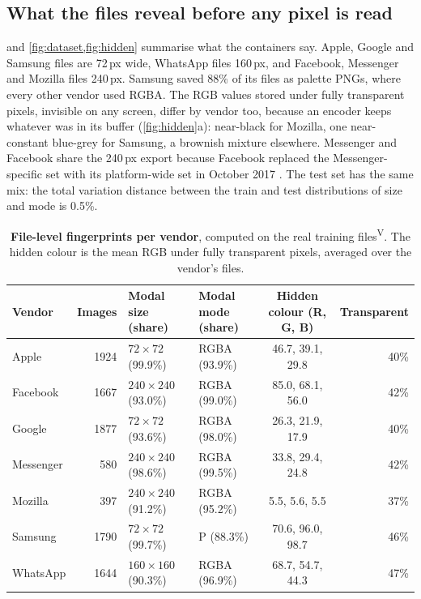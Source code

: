 \documentclass[11pt,a4paper]{article}
\newcommand{\ver}{\textsuperscript{\textcolor{verified}{\sffamily\scriptsize V}}}
\newcommand{\pct}[1]{#1\%}
\begin{document}
\subsection{What the files reveal before any pixel is read}
\label{sec:fingerprints}
 and \cref{fig:dataset,fig:hidden} summarise what the containers say. Apple, Google and Samsung files are 72\,px wide, WhatsApp files 160\,px, and Facebook, Messenger and Mozilla files 240\,px. Samsung saved \pct{88} of its files as palette PNGs, where every other vendor used RGBA. The RGB values stored under fully transparent pixels, invisible on any screen, differ by vendor too, because an encoder keeps whatever was in its buffer (\cref{fig:hidden}a): near-black for Mozilla, one near-constant blue-grey for Samsung, a brownish mixture elsewhere. Messenger and Facebook share the 240\,px export because Facebook replaced the Messenger-specific set with its platform-wide set in October 2017 \cite{emojipedia2017messenger}. The test set has the same mix: the total variation distance between the train and test distributions of size and mode is \pct{0.5}.

\begin{table}[t]
\centering\small
\caption{\textbf{File-level fingerprints per vendor}, computed on the real training files\ver. The hidden colour is the mean RGB under fully transparent pixels, averaged over the vendor's files.}
\label{tab:fingerprints}
\begin{tabular}{@{}lrllcr@{}}
\toprule
Vendor & Images & Modal size (share) & Modal mode (share) & Hidden colour (R, G, B) & Transparent\\
\midrule
Apple     & \num{1924} & $72\times72$ (99.9\%)   & RGBA (93.9\%) & 46.7, 39.1, 29.8 & 40\%\\
Facebook  & \num{1667} & $240\times240$ (93.0\%) & RGBA (99.0\%) & 85.0, 68.1, 56.0 & 42\%\\
Google    & \num{1877} & $72\times72$ (93.6\%)   & RGBA (98.0\%) & 26.3, 21.9, 17.9 & 40\%\\
Messenger & 580        & $240\times240$ (98.6\%) & RGBA (99.5\%) & 33.8, 29.4, 24.8 & 42\%\\
Mozilla   & 397        & $240\times240$ (91.2\%) & RGBA (95.2\%) & 5.5, 5.6, 5.5    & 37\%\\
Samsung   & \num{1790} & $72\times72$ (99.7\%)   & P (88.3\%)    & 70.6, 96.0, 98.7 & 46\%\\
WhatsApp  & \num{1644} & $160\times160$ (90.3\%) & RGBA (96.9\%) & 68.7, 54.7, 44.3 & 47\%\\
\bottomrule
\end{tabular}
\end{table}
\end{document}

